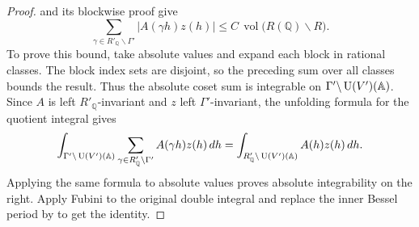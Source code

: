 \begin{proof}
 and its blockwise proof give
\[
 \sum_{\gamma\in R'_{\mathbb Q}\backslash\Gamma'}
      |A(\gamma h)z(h)|\le C\,\operatorname{vol}\bigl(R(\mathbb Q)\backslash R\bigr).
\]
To prove this bound, take absolute values and expand each block in rational classes. The block index sets are disjoint, so the preceding sum over all classes bounds the result. Thus the absolute coset sum is integrable on $\Gamma'\backslash \operatorname{U}(V')(\mathbb A)$. Since $A$ is left $R'_{\mathbb Q}$-invariant and $z$ left $\Gamma'$-invariant, the unfolding formula for the quotient integral gives
\[
 \int_{\Gamma'\backslash \operatorname{U}(V')(\mathbb A)}
      \sum_{\gamma\in R'_{\mathbb Q}\backslash\Gamma'}A(\gamma h)z(h)\,dh
 = \int_{R'_{\mathbb Q}\backslash \operatorname{U}(V')(\mathbb A)}A(h)z(h)\,dh .
\]
Applying the same formula to absolute values proves absolute integrability on the right. Apply Fubini to the original double integral and replace the inner Bessel period by  to get the identity.
\end{proof}

